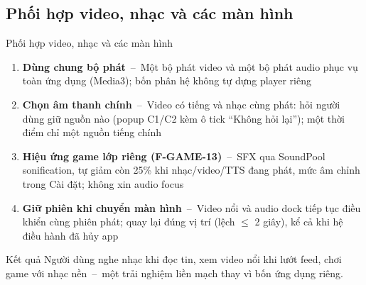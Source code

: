 \subsection{Phối hợp video, nhạc và các màn hình}
\begin{frame}{Phối hợp video, nhạc và các màn hình}
\small
\begin{enumerate}\setlength{\itemsep}{5pt}
\item \textbf{Dùng chung bộ phát}~--~Một bộ phát video và một bộ phát audio phục vụ toàn ứng dụng (Media3); bốn phân hệ không tự dựng player riêng
\item \textbf{Chọn âm thanh chính}~--~Video có tiếng và nhạc cùng phát: hỏi người dùng giữ nguồn nào (popup C1/C2 kèm ô tick ``Không hỏi lại''); một thời điểm chỉ một nguồn tiếng chính
\item \textbf{Hiệu ứng game lớp riêng (F-GAME-13)}~--~SFX qua SoundPool sonification, tự giảm còn 25\% khi nhạc/video/TTS đang phát, mức âm chỉnh trong Cài đặt; không xin audio focus
\item \textbf{Giữ phiên khi chuyển màn hình}~--~Video nổi và audio dock tiếp tục điều khiển cùng phiên phát; quay lại đúng vị trí (lệch $\leq$ 2 giây), kể cả khi hệ điều hành đã hủy app
\end{enumerate}
\vspace{1mm}
\begin{exampleblock}{Kết quả}
Người dùng nghe nhạc khi đọc tin, xem video nổi khi lướt feed, chơi game với nhạc nền~--~một trải nghiệm liền mạch thay vì bốn ứng dụng riêng.
\end{exampleblock}
\end{frame}

